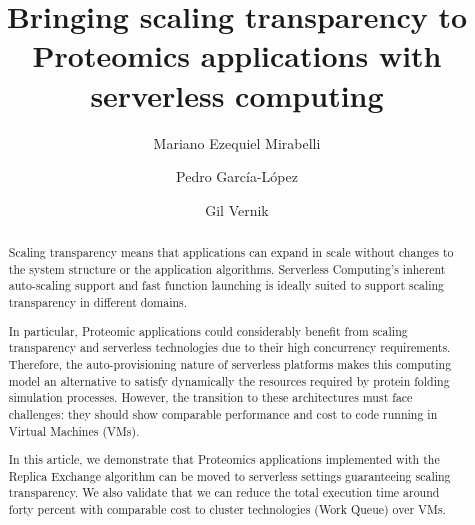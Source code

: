 \documentclass[sigplan, screen]{acmart}
\begin{document}
\title{Bringing scaling transparency to Proteomics applications  with serverless computing}



\author{Mariano Ezequiel Mirabelli}

\author{Pedro Garc\'{i}a-L\'{o}pez}


\author{Gil Vernik}

\renewcommand{\shortauthors}{Mariano Mirabelli, Pedro Garcia Lopez, Gil Vernik}

\begin{abstract}
Scaling transparency means that applications can expand in scale without changes to the system structure or the application algorithms. Serverless Computing's inherent auto-scaling support and fast function launching is ideally suited to support scaling transparency in different domains.

In particular, Proteomic applications could considerably benefit from
scaling transparency and serverless technologies due to their high concurrency requirements. Therefore, the auto-provisioning nature of serverless platforms makes this computing model an alternative to satisfy dynamically the resources required by protein folding simulation processes. However, the transition to these architectures must face challenges: they should show comparable performance and cost to code running in Virtual Machines (VMs).

In this article, we demonstrate that  Proteomics applications implemented with the Replica Exchange algorithm can be moved to serverless settings guaranteeing scaling transparency. We also validate that we can reduce the total execution time around forty percent with comparable cost to cluster technologies (Work Queue) over VMs.
\end{abstract}
\end{document}
